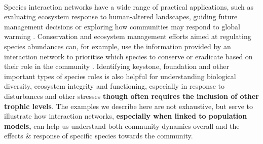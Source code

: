 \documentclass[a4,12pt]{article}
\begin{document}
\begin{refsection}


    \paragraph{}
    Species interaction networks have a wide range of practical applications, such as evaluating ecosystem response to human-altered landscapes, guiding future management decisions \parencite{Ross2011} or exploring how communities may respond to global warming \parencite{Gorman2019}. Conservation and ecosystem management efforts aimed at regulating species abundances can, for example, use the information provided by an interaction network to prioritise which species to conserve or eradicate based on their role in the community \parencite{Cirtwill2018a}. Identifying keystone, foundation and other important types of species roles is also helpful for understanding biological diversity, ecosystem integrity and functioning, especially in response to disturbances and other stresses \parencite{Nyakatya2008, Orwin2016, Losapio2017, Narwani2019} \textbf{though often requires the inclusion of other trophic levels}. The examples we describe here are not exhaustive, but serve to illustrate how interaction networks, \textbf{especially when linked to population models,} can help us understand both community dynamics overall and the effects \& response of specific species towards the community. 


\end{refsection}
\end{document}
